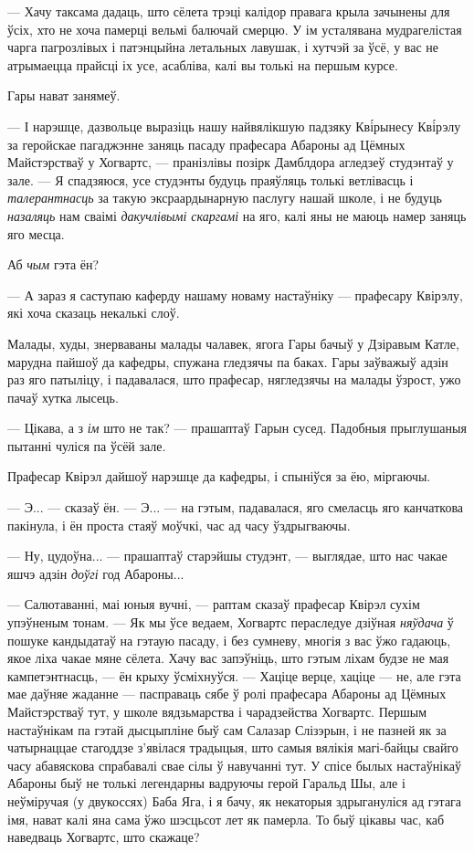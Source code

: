 --- Хачу таксама дадаць, што сёлета трэці калідор правага крыла зачынены для ўсіх,
хто не хоча памерці вельмі балючай смерцю. У ім усталявана мудрагелістая 
чарга пагрозлівых і патэнцыйна летальных лавушак, і хутчэй за ўсё, у вас 
не атрымаецца прайсці іх усе, асабліва, калі вы толькі на першым курсе.

Гары нават занямеў.

--- І нарэшце, дазвольце выразіць нашу найвялікшую падзяку Кв\'ірынесу Кв\'ірэлу за
геройскае пагаджэнне заняць пасаду прафесара Абароны ад Цёмных Майстэрстваў у Хогвартс, ---
пранізлівы позірк Дамблдора агледзеў студэнтаў у зале. ---
Я спадзяюся, усе студэнты будуць праяўляць толькі ветлівасць і \emph{талерантнасць} 
за такую эксраардынарную паслугу нашай школе, і не будуць \emph{назаляць} нам 
сваімі \emph{дакучлівымі скаргамі} на яго, калі яны не маюць намер заняць яго месца.

Аб \emph{чым} гэта ён?

--- А зараз я саступаю каферду нашаму новаму настаўніку --- прафесару Квірэлу, які 
хоча сказаць некалькі слоў.

Малады, худы, знерваваны малады чалавек, ягога Гары бачыў у Дзіравым Катле, марудна
пайшоў да кафедры, спужана гледзячы па баках. Гары заўважыў адзін раз яго патыліцу, і
падавалася, што прафесар, нягледзячы на малады ўзрост, ужо пачаў хутка лысець.

--- Цікава, а з \emph{ім} што не так? --- прашаптаў Гарын сусед. Падобныя прыглушаныя
пытанні чуліся па ўсёй зале. 

Прафесар Квірэл дайшоў нарэшце да кафедры, і спыніўся за ёю, міргаючы.

--- Э... --- сказаў ён. --- Э... --- на гэтым, падавалася, яго смеласць яго канчаткова
пакінула, і ён проста стаяў моўчкі, час ад часу ўздрыгваючы. 

--- Ну, цудоўна... --- прашаптаў старэйшы студэнт, --- выглядае, што нас чакае яшчэ адзін 
\emph{доўгі} год Абароны...

--- Салютаванні, маі юныя вучні, --- раптам сказаў прафесар Квірэл сухім упэўненым
тонам. --- Як мы ўсе ведаем, Хогвартс пераследуе дзіўная \emph{няўдача} ў 
пошуке кандыдатаў на гэтаую пасаду, і без сумневу, многія з вас ўжо гадаюць, якое 
ліха чакае мяне сёлета. Хачу вас запэўніць, што гэтым ліхам будзе не мая кампетэнтнасць,
--- ён крыху ўсміхнуўся. --- Хаціце верце, хаціце --- не, але гэта мае даўняе жаданне ---
пасправаць сябе ў ролі прафесара Абароны ад Цёмных Майстэрстваў тут, у школе 
вядзьмарства і чарадзейства Хогвартс. Першым настаўнікам па гэтай дысцыпліне быў 
сам Салазар Слізэрын, і не пазней як за чатырнаццае стагоддзе з'явілася традыцыя, 
што самыя вялікія магі-байцы свайго часу абавяскова спрабавалі свае сілы ў навучанні 
тут. У спісе былых настаўнікаў Абароны быў не толькі легендарны вадруючы герой 
Гаральд Шы, але і неўміручая (у двукоссях) Баба Яга, і я бачу, як некаторыя 
здрыгануліся ад гэтага імя, нават калі яна сама ўжо шэсцьсот лет як памерла. 
То быў цікавы час, каб наведваць Хогвартс, што скажаце?

